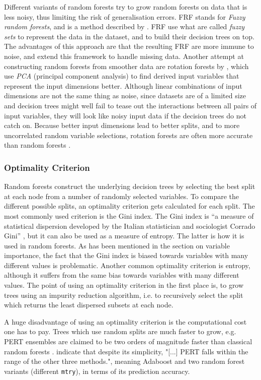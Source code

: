 \documentclass[a4paper,man,12pt,apacite,floatsintext]{apa6} %
\begin{document}
Different variants of random forests try to grow random forests on data
that is less noisy, thus limiting the risk of generalisation errors.
FRF stands for \emph{Fuzzy random forests}, and is a method described by
.
FRF use what are called \emph{fuzzy sets} to represent the data in the dataset,
and to build their decision trees on top.
The advantages of this approach are that the resulting FRF are more immune
to noise, and  extend this framework to
handle missing data.
Another attempt at constructing random forests from smoother data are
rotation forests by \cite{rodriguez2006rotation}, which use
\emph{PCA} (principal component analysis) to find derived input variables that
represent the input dimensions better.
Although linear combinations of input dimensions are not the same thing
as noise, since datasets are of a limited size and decision trees
might well fail to tease out the interactions between all pairs of input
variables, they will look like noisy input data if the decision trees
do not catch on.
Because better input dimensions lead to better splits, and to more
uncorrelated random variable selections, rotation forests are often more
accurate than random forests \cite{rodriguez2006rotation}.

\subsubsection{Optimality Criterion}
Random forests construct the underlying decision trees by selecting the
best split at each node from a number of randomly selected variables.
To compare the different possible splits, an optimality criterion gets
calculated for each split.
The most commonly used criterion is the Gini index.
The Gini index is “a measure of statistical dispersion developed by the
Italian statistician and sociologist Corrado Gini” \cite{wpGINI},
but it can also be used as a measure of entropy.
The latter is how it is used in random forests.
As has been mentioned in the section on variable importance, the fact that
the Gini index is biased towards variables with many different values
is problematic.
Another common optimality criterion is entropy, although it suffers from
the same bias towards variables with many different values.
The point of using an optimality criterion in the first place is,
to grow trees using an impurity reduction algorithm, i.e. to recursively select the split
which returns the least dispersed subsets at each node.

A huge disadvantage of using an optimality criterion is the computational cost
one has to pay.
Trees which use random splits are much faster to grow, e.g. PERT ensembles
are claimed to be two orders of magnitude faster than classical
random forests \cite{cutler2001pert}.
 indicate that despite its simplicity,
"[...] PERT falls within the range of the other three methods.", meaning
Adaboost and two random forest variants (different \texttt{mtry}),
in terms of its prediction accuracy.
\end{document}
